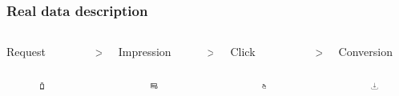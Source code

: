 \documentclass[intlimits, 9pt, unicode]{beamer}
\begin{document}
\begin{frame}
\frametitle{Real data description}

   \begin{columns}
    \begin{column}{0.25\textwidth}
    \centering
     Request
     \begin{figure}
	\includegraphics[height=1cm]{images/scheme_request}
     \end{figure}
     \end{column}
    \begin{column}{0.001\textwidth}
    \centering
	>
     \end{column}
    \begin{column}{0.25\textwidth}
    \centering
    Impression
     \begin{figure}
	\includegraphics[height=1cm]{images/scheme_impression}
     \end{figure}
    \end{column}
    \begin{column}{0.001\textwidth}
    \centering
    >
    \end{column}
    \begin{column}{0.25\textwidth}
    \centering
    Click
     \begin{figure}
	\includegraphics[height=1cm]{images/scheme_click}
     \end{figure}
    \end{column}
    \begin{column}{0.001\textwidth}
    \centering
    >
    \end{column}
    \begin{column}{0.25\textwidth}
    \centering
     Conversion
     \begin{figure}
	\includegraphics[height=1cm]{images/scheme_conversion}
     \end{figure}
     \end{column}
     \end{columns}


\end{frame}
\end{document}
